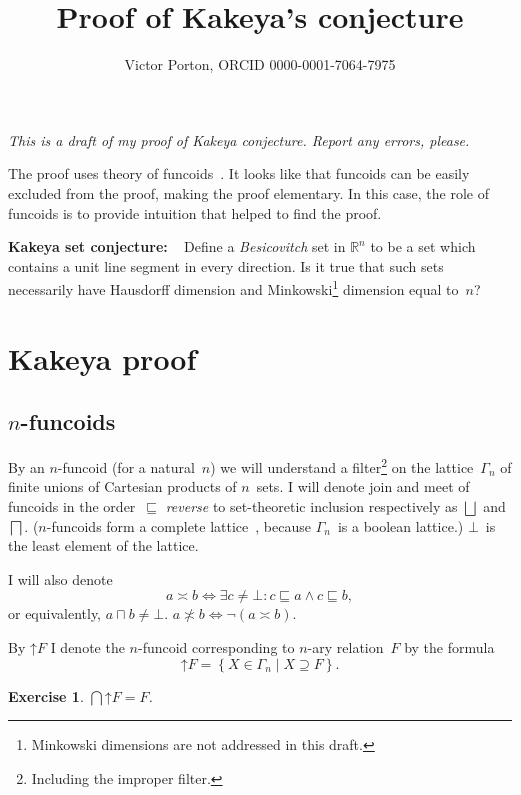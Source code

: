 \documentclass[oneside,draft]{amsart}
\title{Proof of Kakeya's conjecture}
\author{Victor Porton, ORCID 0000-0001-7064-7975}
\newcommand{\setcond}[2]{\left\{#1\mid#2\right\}}
\newcommand{\intrs}{\not\asymp}
\newcommand{\nintrs}{\asymp}
\newtheorem{exer}{Exercise}
\begin{document}
\maketitle  

\emph{This is a draft of my proof of Kakeya conjecture. Report any errors, please.}

The proof uses theory of funcoids~\cite{volume-1}. It looks like that funcoids can be easily excluded from the proof, making the proof elementary. In this case, the role of funcoids is to provide intuition that helped to find the proof.

\textbf{Kakeya set conjecture:} \cite{kakeya-long}~\cite{tao-blog-kakeya} Define a \emph{Besicovitch} set in $\mathbb{R}^n$ to be a set which contains a unit line segment in every direction. Is it true that such sets necessarily have Hausdorff dimension and Minkowski\footnote{Minkowski dimensions are not addressed in this draft.} dimension equal to~$n$?

\section{Kakeya proof}

\subsection{$n$-fun\-co\-ids}

By an $n$-fun\-co\-id (for a natural~$n$) we will understand a filter\footnote{Including the improper filter.} on the lattice~$\Gamma_n$ of finite unions of Cartesian products of $n$~sets. I will denote join and meet of funcoids in the order~$\sqsubseteq$ \emph{reverse} to set-the\-o\-re\-tic inclusion respectively as $\bigsqcup$ and $\bigsqcap$. ($n$-fun\-co\-ids form a complete lattice~\cite{volume-1}, because $\Gamma_n$~is a boolean lattice.) $\bot$~is the least element of the lattice.

I will also denote \[ a\nintrs b \Leftrightarrow \exists c\ne\bot: c\sqsubseteq a\land c\sqsubseteq b, \] or equivalently, $a\sqcap b\ne\bot$.
$a\intrs b\Leftrightarrow\lnot(a\nintrs b)$.

By $\mathord{\uparrow}F$ I denote the $n$-fun\-co\-id corresponding to $n$-ary relation~$F$ by the formula
\[ \mathord{\uparrow}F = \setcond{X\in\Gamma_n}{X\supseteq F}. \]

\begin{exer}
$\bigcap\mathord{\uparrow}F = F$.
\end{exer}
\end{document}
